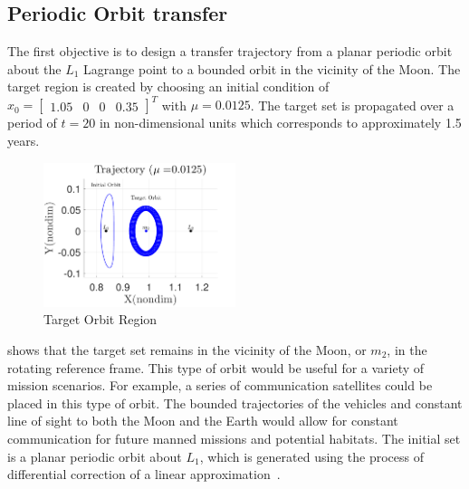 \documentclass[smallcondensed]{svjour3}
\begin{document}
\subsection{Periodic Orbit transfer}\label{sec:periodic_orbit_transfer}
The first objective is to design a transfer trajectory from a planar periodic orbit about the \( L_1\) Lagrange point to a bounded orbit in the vicinity of the Moon.
The target region is created by choosing an initial condition of \( x_0 = \begin{bmatrix}1.05 & 0 & 0 & 0.35 \end{bmatrix}^T \) with \( \mu = 0.0125 \).
The target set is propagated over a period of \( t = \num{20} \) in non-dimensional units which corresponds to approximately \num{1.5} years.
\begin{figure}[htbp]
   \centering
   \includegraphics[width=0.5\textwidth]{moon_orbit} %
   \caption{Target Orbit Region}
   \label{fig:moon_orbit}
\end{figure}
 shows that the target set remains in the vicinity of the Moon, or \( m_2\), in the rotating reference frame. 
This type of orbit would be useful for a variety of mission scenarios.
For example, a series of communication satellites could be placed in this type of orbit. 
The bounded trajectories of the vehicles and constant line of sight to both the Moon and the Earth would allow for constant communication for future manned missions and potential habitats.
The initial set is a planar periodic orbit about \( L_1\), which is generated using the process of differential correction of a linear approximation~\cite{koon2011}.
\end{document}
